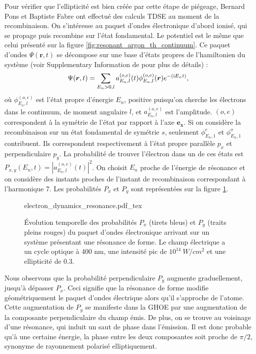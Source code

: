 Pour vérifier que l'ellipticité est bien créée par cette étape de piégeage, Bernard Pons et Baptiste Fabre ont effectué des calculs TDSE au moment de la recombinaison. On s'intéresse au paquet d'ondes électronique d'abord ionisé, qui se propage puis recombine sur l'état fondamental. Le potentiel est le même que celui présenté sur la figure \ref{fig:resonant_argon_th_continuum}. Ce paquet d'ondes $\Psi(\bm{r},t)$ se décompose sur une base d'états propres de l'hamiltonien du système (voir Supplementary Information de  pour plus de détails) :
\begin{equation}
\Psi(\bm{r},t)=\sum_{E_n>0,l} a_{E_n,l}^{(o,e)}(t)\phi_{E_n,l}^{(o,e)}(\bm{r})e^{-(\mathrm{i} E_n t)},
\end{equation}
où $\phi_{E_n,l}^{(o,e)}$ est l'état propre d'énergie $E_n$, positive puisqu'on cherche les électrons dans le continuum, de moment angulaire $l$, et $a_{E_n,l}^{(o,e)}$ est l'amplitude. $(o,e)$ correspondent à la symétrie de l'état par rapport à l'axe $\bm{e_x}$. Si on considère la recombinaison sur un état fondamental de symétrie $s$, seulement $\phi_{E_n,1}^{e}$ et $\phi_{E_n,1}^{o}$ contribuent. Ils correspondent respectivement à l'état propre parallèle $p_x$ et perpendiculaire $p_y$. La probabilité de trouver l'électron dans un de ces états est $P_{x,y}(E_n,t) = |a_{E_n,l}^{(o,e)}(t)|^2$. On choisit $E_n$ proche de l'énergie de résonance et on considère des instants proches de l'instant de recombinaison correspondant à l'harmonique 7. Les probabilités $P_x$ et $P_y$ sont représentées sur la figure \ref{fig:resonant_proba}.

\begin{figure}[!ht]
\centering
\def\svgwidth{1\columnwidth}
{electron_dynamics_resonance.pdf_tex}
\caption{\'{E}volution temporelle des probabilités $P_x$ (tirets bleus) et $P_y$ (traits pleins rouges) du paquet d'ondes électronique arrivant sur un système présentant une résonance de forme. Le champ électrique a un cycle optique à 400 nm, une intensité pic de $10^{14}~\si{W/cm^2}$ et une ellipticité de 0.3.}
\label{fig:resonant_proba}
\end{figure}

Nous observons que la probabilité perpendiculaire $P_y$ augmente graduellement, jusqu'à dépasser $P_x$. Ceci signifie que la résonance de forme modifie géométriquement le paquet d'ondes électrique alors qu'il s'approche de l'atome. Cette augmentation de $P_y$ se manifeste dans la GHOE par une augmentation de la composante perpendiculaire du champ émis. De plus, on se trouve au voisinage d'une résonance, qui induit un saut de phase dans l'émission. Il est donc probable qu'à une certaine énergie, la phase entre les deux composantes soit proche de $\pi/2$, synonyme de rayonnement polarisé elliptiquement.


